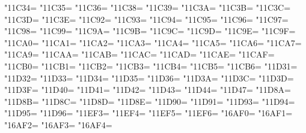 \XeTeXcharclass"11C34=\KclassCM
\XeTeXcharclass"11C35=\KclassCM
\XeTeXcharclass"11C36=\KclassCM
\XeTeXcharclass"11C38=\KclassCM
\XeTeXcharclass"11C39=\KclassCM
\XeTeXcharclass"11C3A=\KclassCM
\XeTeXcharclass"11C3B=\KclassCM
\XeTeXcharclass"11C3C=\KclassCM
\XeTeXcharclass"11C3D=\KclassCM
\XeTeXcharclass"11C3E=\KclassCM
\XeTeXcharclass"11C92=\KclassCM
\XeTeXcharclass"11C93=\KclassCM
\XeTeXcharclass"11C94=\KclassCM
\XeTeXcharclass"11C95=\KclassCM
\XeTeXcharclass"11C96=\KclassCM
\XeTeXcharclass"11C97=\KclassCM
\XeTeXcharclass"11C98=\KclassCM
\XeTeXcharclass"11C99=\KclassCM
\XeTeXcharclass"11C9A=\KclassCM
\XeTeXcharclass"11C9B=\KclassCM
\XeTeXcharclass"11C9C=\KclassCM
\XeTeXcharclass"11C9D=\KclassCM
\XeTeXcharclass"11C9E=\KclassCM
\XeTeXcharclass"11C9F=\KclassCM
\XeTeXcharclass"11CA0=\KclassCM
\XeTeXcharclass"11CA1=\KclassCM
\XeTeXcharclass"11CA2=\KclassCM
\XeTeXcharclass"11CA3=\KclassCM
\XeTeXcharclass"11CA4=\KclassCM
\XeTeXcharclass"11CA5=\KclassCM
\XeTeXcharclass"11CA6=\KclassCM
\XeTeXcharclass"11CA7=\KclassCM
\XeTeXcharclass"11CA9=\KclassCM
\XeTeXcharclass"11CAA=\KclassCM
\XeTeXcharclass"11CAB=\KclassCM
\XeTeXcharclass"11CAC=\KclassCM
\XeTeXcharclass"11CAD=\KclassCM
\XeTeXcharclass"11CAE=\KclassCM
\XeTeXcharclass"11CAF=\KclassCM
\XeTeXcharclass"11CB0=\KclassCM
\XeTeXcharclass"11CB1=\KclassCM
\XeTeXcharclass"11CB2=\KclassCM
\XeTeXcharclass"11CB3=\KclassCM
\XeTeXcharclass"11CB4=\KclassCM
\XeTeXcharclass"11CB5=\KclassCM
\XeTeXcharclass"11CB6=\KclassCM
\XeTeXcharclass"11D31=\KclassCM
\XeTeXcharclass"11D32=\KclassCM
\XeTeXcharclass"11D33=\KclassCM
\XeTeXcharclass"11D34=\KclassCM
\XeTeXcharclass"11D35=\KclassCM
\XeTeXcharclass"11D36=\KclassCM
\XeTeXcharclass"11D3A=\KclassCM
\XeTeXcharclass"11D3C=\KclassCM
\XeTeXcharclass"11D3D=\KclassCM
\XeTeXcharclass"11D3F=\KclassCM
\XeTeXcharclass"11D40=\KclassCM
\XeTeXcharclass"11D41=\KclassCM
\XeTeXcharclass"11D42=\KclassCM
\XeTeXcharclass"11D43=\KclassCM
\XeTeXcharclass"11D44=\KclassCM
\XeTeXcharclass"11D47=\KclassCM
\XeTeXcharclass"11D8A=\KclassCM
\XeTeXcharclass"11D8B=\KclassCM
\XeTeXcharclass"11D8C=\KclassCM
\XeTeXcharclass"11D8D=\KclassCM
\XeTeXcharclass"11D8E=\KclassCM
\XeTeXcharclass"11D90=\KclassCM
\XeTeXcharclass"11D91=\KclassCM
\XeTeXcharclass"11D93=\KclassCM
\XeTeXcharclass"11D94=\KclassCM
\XeTeXcharclass"11D95=\KclassCM
\XeTeXcharclass"11D96=\KclassCM
\XeTeXcharclass"11EF3=\KclassCM
\XeTeXcharclass"11EF4=\KclassCM
\XeTeXcharclass"11EF5=\KclassCM
\XeTeXcharclass"11EF6=\KclassCM
\XeTeXcharclass"16AF0=\KclassCM
\XeTeXcharclass"16AF1=\KclassCM
\XeTeXcharclass"16AF2=\KclassCM
\XeTeXcharclass"16AF3=\KclassCM
\XeTeXcharclass"16AF4=\KclassCM
